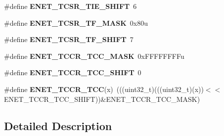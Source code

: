 \begin{DoxyCompactItemize}
\item 
\#define {\bfseries E\+N\+E\+T\+\_\+\+T\+C\+S\+R\+\_\+\+T\+I\+E\+\_\+\+S\+H\+I\+FT}~6\hypertarget{group__ENET__Register__Masks_ga35fcee5f4e7c9e5b69af4039ee4fa537}{}\label{group__ENET__Register__Masks_ga35fcee5f4e7c9e5b69af4039ee4fa537}

\item 
\#define {\bfseries E\+N\+E\+T\+\_\+\+T\+C\+S\+R\+\_\+\+T\+F\+\_\+\+M\+A\+SK}~0x80u\hypertarget{group__ENET__Register__Masks_ga79d70e9a593487d29ce2e6b9c9021c59}{}\label{group__ENET__Register__Masks_ga79d70e9a593487d29ce2e6b9c9021c59}

\item 
\#define {\bfseries E\+N\+E\+T\+\_\+\+T\+C\+S\+R\+\_\+\+T\+F\+\_\+\+S\+H\+I\+FT}~7\hypertarget{group__ENET__Register__Masks_gaa0ab6243262f645ae70f481ba9c33203}{}\label{group__ENET__Register__Masks_gaa0ab6243262f645ae70f481ba9c33203}

\item 
\#define {\bfseries E\+N\+E\+T\+\_\+\+T\+C\+C\+R\+\_\+\+T\+C\+C\+\_\+\+M\+A\+SK}~0x\+F\+F\+F\+F\+F\+F\+F\+Fu\hypertarget{group__ENET__Register__Masks_ga6f9999013e2cb91eaf8ebbdc67ca9fe8}{}\label{group__ENET__Register__Masks_ga6f9999013e2cb91eaf8ebbdc67ca9fe8}

\item 
\#define {\bfseries E\+N\+E\+T\+\_\+\+T\+C\+C\+R\+\_\+\+T\+C\+C\+\_\+\+S\+H\+I\+FT}~0\hypertarget{group__ENET__Register__Masks_ga72e171b218136489e1e0b5dcb7aefab7}{}\label{group__ENET__Register__Masks_ga72e171b218136489e1e0b5dcb7aefab7}

\item 
\#define {\bfseries E\+N\+E\+T\+\_\+\+T\+C\+C\+R\+\_\+\+T\+CC}(x)~(((uint32\+\_\+t)(((uint32\+\_\+t)(x))$<$$<$E\+N\+E\+T\+\_\+\+T\+C\+C\+R\+\_\+\+T\+C\+C\+\_\+\+S\+H\+I\+FT))\&E\+N\+E\+T\+\_\+\+T\+C\+C\+R\+\_\+\+T\+C\+C\+\_\+\+M\+A\+SK)\hypertarget{group__ENET__Register__Masks_ga7b276385d78bf216e8b3c0efb45d2f87}{}\label{group__ENET__Register__Masks_ga7b276385d78bf216e8b3c0efb45d2f87}

\end{DoxyCompactItemize}


\subsection{Detailed Description}

